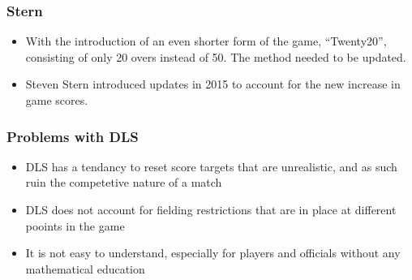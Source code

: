 \documentclass{beamer}
\begin{document}
\begin{frame}
    \frametitle{Stern}
    \begin{itemize}
        \item With the introduction of an even shorter form of the game, ``Twenty20'', consisting of only 20 
            overs instead of 50. The method needed to be updated.
        \pause
        \item Steven Stern introduced updates in 2015 to account for the new increase in game scores. 
    \end{itemize}
\end{frame}


\begin{frame}
\frametitle{Problems with DLS}
    \begin{itemize}
        \item DLS has a tendancy to reset score targets that are unrealistic, and as such ruin the competetive 
            nature of a match
        \pause
        \item DLS does not account for fielding restrictions that are in place at different pooints in the game 
        \pause
        \item It is not easy to understand, especially for players and officials without any mathematical education
    \end{itemize}
\end{frame}
\end{document}
